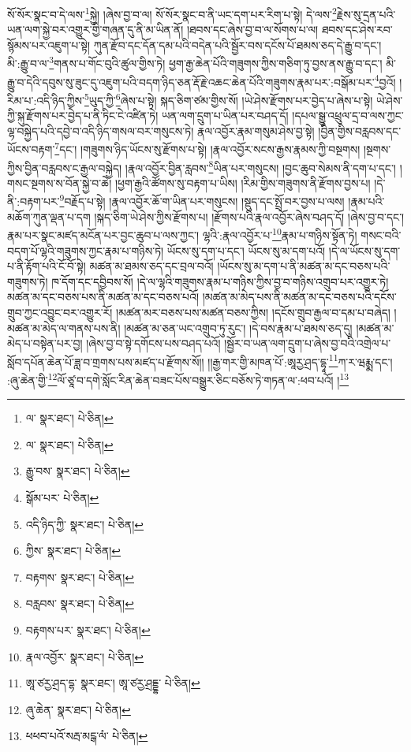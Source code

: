 སོ་སོར་སྣང་བ་དེ་ལས་\footnote{ལ་  སྣར་ཐང་།  པེ་ཅིན། }སྐྱེ། །ཞེས་བྱ་བ་ལ། སོ་སོར་སྣང་བ་ནི་ཡང་དག་པར་རིག་པ་སྟེ། དེ་ལས་\footnote{ལ་  སྣར་ཐང་།  པེ་ཅིན། }རྗེས་སུ་དྲན་པའི་ཡན་ལག་སྐྱེ་བར་འགྱུར་གྱི་གཞན་དུ་ནི་མ་ཡིན་ནོ། །ཐབས་དང་ཞེས་བྱ་བ་ལ་སོགས་པ་ལ། ཐབས་དང་ཤེས་རབ་སྙོམས་པར་འཇུག་པ་སྟེ། ཀུན་རྫོབ་དང་དོན་དམ་པའི་བདེན་པའི་སྦྱོར་བས་དངོས་པོ་ཐམས་ཅད་དེ་རྒྱུ་བ་དང་། མི་:རྒྱུ་བ་ལ་\footnote{རྒྱུ་བས་  སྣར་ཐང་།  པེ་ཅིན། }གནས་པ་གོང་བུའི་ཚུལ་གྱིས་ཏེ། ཕྱག་རྒྱ་ཆེན་པོའི་གཟུགས་ཀྱིས་གཅིག་ཏུ་བྱས་ནས་རྒྱུ་བ་དང་། མི་རྒྱུ་བ་དེའི་དབུས་སུ་ཟུང་དུ་འཇུག་པའི་བདག་ཉིད་ཅན་རྡོ་རྗེ་འཆང་ཆེན་པོའི་གཟུགས་རྣམ་པར་:བསྒོམ་པར་\footnote{སྒོམ་པར་  པེ་ཅིན། }བྱའོ། །རིམ་པ་:འདི་ཉིད་ཀྱིས་\footnote{འདི་ཉིད་ཀྱི་  སྣར་ཐང་།  པེ་ཅིན། }ཡུད་ཀྱི་\footnote{ཀྱིས་  སྣར་ཐང་།  པེ་ཅིན། }ཞེས་པ་སྟེ། སྐད་ཅིག་ཙམ་གྱིས་སོ། །ཡེ་ཤེས་རྫོགས་པར་བྱེད་པ་ཞེས་པ་སྟེ། ཡེ་ཤེས་ཀྱི་སྐུ་རྫོགས་པར་བྱེད་པ་ནི་ཏིང་ངེ་འཛིན་ཏེ། ཡན་ལག་དྲུག་པ་ཡིན་པར་བཤད་དོ། །དཔལ་སྒྱུ་འཕྲུལ་དྲ་བ་ལས་ཀྱང་ལྷ་བསྐྱེད་པའི་དབྱེ་བ་འདི་ཉིད་གསལ་བར་གསུངས་ཏེ། རྣལ་འབྱོར་རྣམ་གསུམ་ཤེས་བྱ་སྟེ། །བྱིན་གྱིས་བརླབས་དང་ཡོངས་བརྟག་\footnote{བརྟགས་  སྣར་ཐང་།  པེ་ཅིན། }དང་། །གཟུགས་ཉིད་ཡོངས་སུ་རྫོགས་པ་སྟེ། །རྣལ་འབྱོར་སངས་རྒྱས་རྣམས་ཀྱི་བསྔགས། །སྔགས་ཀྱིས་བྱིན་བརླབས་ང་རྒྱལ་བསྐྱེད། །རྣལ་འབྱོར་བྱིན་རླབས་\footnote{བརླབས་  སྣར་ཐང་།  པེ་ཅིན། }ཡིན་པར་གསུངས། །བྱང་ཆུབ་སེམས་ནི་དག་པ་དང་། །གསང་སྔགས་ས་བོན་སྐྱེ་བ་ཆེ། །ཕྱག་རྒྱའི་ཚོགས་སུ་བརྟག་པ་ཡིས། །རིམ་གྱིས་གཟུགས་ནི་རྫོགས་བྱས་པ། །དེ་ནི་:བརྟག་པར་\footnote{བརྟགས་པར་  སྣར་ཐང་།  པེ་ཅིན། }བརྗོད་པ་སྟེ། །རྣལ་འབྱོར་ཆོ་ག་ཡིན་པར་གསུངས། །སྡུད་དང་སྤྲོ་བར་བྱས་པ་ལས། །རྣམ་པའི་མཆོག་ཀུན་ལྡན་པ་དག །སྐད་ཅིག་ཡེ་ཤེས་ཀྱིས་རྫོགས་པ། །རྫོགས་པའི་རྣལ་འབྱོར་ཞེས་བཤད་དོ། །ཞེས་བྱ་བ་དང་། རྣམ་པར་སྣང་མཛད་མངོན་པར་བྱང་ཆུབ་པ་ལས་ཀྱང་། ལྷའི་:རྣལ་འབྱོར་པ་\footnote{རྣལ་འབྱོར་  སྣར་ཐང་།  པེ་ཅིན། }རྣམ་པ་གཉིས་སྟོན་ཏེ། གསང་བའི་བདག་པོ་ལྷའི་གཟུགས་ཀྱང་རྣམ་པ་གཉིས་ཏེ། ཡོངས་སུ་དག་པ་དང་། ཡོངས་སུ་མ་དག་པའོ། །དེ་ལ་ཡོངས་སུ་དག་པ་ནི་རྟོག་པའི་ངོ་བོ་སྟེ། མཚན་མ་ཐམས་ཅད་དང་བྲལ་བའོ། །ཡོངས་སུ་མ་དག་པ་ནི་མཚན་མ་དང་བཅས་པའི་གཟུགས་ཏེ། ཁ་དོག་དང་དབྱིབས་སོ། །དེ་ལ་ལྷའི་གཟུགས་རྣམ་པ་གཉིས་ཀྱིས་བྱ་བ་གཉིས་འགྲུབ་པར་འགྱུར་ཏེ། མཚན་མ་དང་བཅས་པས་ནི་མཚན་མ་དང་བཅས་པའོ། །མཚན་མ་མེད་པས་ནི་མཚན་མ་དང་བཅས་པའི་དངོས་གྲུབ་ཀྱང་འབྱུང་བར་འགྱུར་རོ། །མཚན་མར་བཅས་པས་མཚན་བཅས་ཀྱིས། །དངོས་གྲུབ་རྒྱལ་བ་དམ་པ་བཞེད། །མཚན་མ་མེད་ལ་གནས་པས་ནི། །མཚན་མ་ཅན་ཡང་འགྲུབ་ཏུ་རུང་། །དེ་བས་རྣམ་པ་ཐམས་ཅད་དུ། །མཚན་མ་མེད་པ་བསྟེན་པར་བྱ། །ཞེས་བྱ་བ་སྟེ་དགོངས་པས་བཤད་པའོ། །སྦྱོར་བ་ཡན་ལག་དྲུག་པ་ཞེས་བྱ་བའི་འགྲེལ་པ་སློབ་དཔོན་ཆེན་པོ་ཟླ་བ་གྲགས་པས་མཛད་པ་རྫོགས་སོ།། །།རྒྱ་གར་གྱི་མཁན་པོ་:ཨཱརྱ་ཤྲད་དྷཱ་\footnote{ཨཱ་ཙརྱ་ཤྲད་དྷ་  སྣར་ཐང་། ཨཱ་ཙརྱ་ཤྲདྡྷ་  པེ་ཅིན། }ཀ་ར་ཝརྨྨ་དང་། :ཞུ་ཆེན་གྱི་\footnote{ཞུ་ཆེན་  སྣར་ཐང་།  པེ་ཅིན། }ལོ་ཙཱ་བ་དགེ་སློང་རིན་ཆེན་བཟང་པོས་བསྒྱུར་ཅིང་བཅོས་ཏེ་གཏན་ལ་:ཕབ་པའོ། །\footnote{ཕཕབ་པའོ་སརྦ་མངྒ་ལཾ་  པེ་ཅིན། }